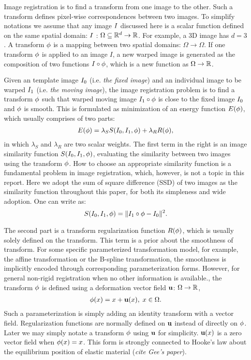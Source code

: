 \documentclass[letterpaper,12pt]{article}
\begin{document}
Image registration is to find a transform from one image to the other. Such a transform defines pixel-wise correspondences between two images. 
To simplify notations we assume that any image $I$ discussed here is a scalar function defined on the same spatial domain: $I$ : $\Omega \subseteq \mathbb{R}^d \to \mathbb{R}$. 
For example, a 3D image has $d=3$. A transform $\phi$ is a mapping between two spatial domains: $\Omega \rightarrow \Omega$. 
If one transform $\phi$ is applied to an image $I$, a new warped image is generated as the composition of two functions $I \circ \phi$, which is a new function as $\Omega \to \mathbb{R}$. 

Given an template image $I_0$ (i.e. \textit{the fixed image}) and an individual image to be warped $I_1$ (i.e. \textit{the moving image}), the image registration problem is to find a transform $\phi$ such that warped moving image $I_1 \circ \phi$ is close to the fixed image $I_0$ and $\phi$ is smooth. 
This is formulated as minimization of an energy function $E(\phi)$, which usually comprises of two parts:
\begin{align}
\label{eq:energy}
E(\phi) = \lambda_S S(I_0,I_1,\phi) + \lambda_R R(\phi),
\end{align}
in which $\lambda_S$ and $\lambda_R$ are two scalar weights. The first term in the right is an image similarity function $S(I_0, I_1, \phi)$, evaluating the similarity between two images using the transform $\phi$. 
How to choose an appropriate similarity function is a fundamental problem in image registration, which, however, is not a topic in this report. 
Here we adopt the sum of square difference (SSD) of two images as the similarity function throughout this paper, for both its simpleness and wide adoption. One can write as:
\begin{align}
S(I_0, I_1, \phi) = \| I_1 \circ \phi - I_0 \|^2.
\label{eq:SSD}
\end{align}

The second part is a transform regularization function $R(\phi)$, which is usually solely defined on the transform. This term is a prior about the smoothness of transform. For some specific parameterized transformation model, for example, the affine transformation or the B-spline transformation, the smoothness is implicitly encoded through corresponding parameterization forms. 
However, for general non-rigid registration when no other information is available., the transform $\phi$ is defined using a deformation vector field $\mathbf{u}$: $\Omega \to \mathbb{R}$,
\begin{align}
\phi(x) = x + \mathbf{u}(x), \; x \in \Omega.
\end{align}
Such a parameterization is simply adding an identity transform with a vector field. 
Regularization functions are normally defined on $\mathbf{u}$ instead of directly on $\phi$.
Later we may simply notate a transform $\phi$ using $\mathbf{u}$ for simplicity. 
$\mathbf{u}(x)$ is a zero vector field when $\phi(x)=x$. 
This form is strongly connected to Hooke's law about the equilibrium position of elastic material (\textit{cite Gee's paper}). 
\end{document}
